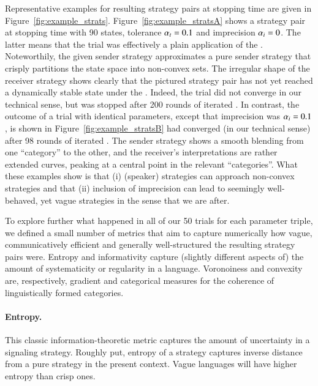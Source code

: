 Representative examples for resulting strategy pairs at stopping time
are given in
Figure~\ref{fig:example_strats}. Figure~\ref{fig:example_stratsA}
shows a strategy pair at stopping time with 90 states, tolerance
$\alpha_t = 0.1$ and imprecision $\alpha_i = 0$. The latter means
that the trial was effectively a plain application of the
\rd. Noteworthily, the given sender strategy approximates a pure
sender strategy that crisply partitions the state space into
non-convex sets. The irregular shape of the receiver strategy shows
clearly that the pictured strategy pair has not yet reached a
dynamically stable state under the \rd. Indeed, the trial did not
converge in our technical sense, but was stopped after 200 rounds of
iterated \rdd. In contrast, the outcome of a trial with identical
parameters, except that imprecision was $\alpha_i = 0.1$, is shown
in Figure~\ref{fig:example_stratsB} had converged (in our technical
sense) after 98 rounds of iterated \rdd. The sender strategy shows a
smooth blending from one ``category'' to the other, and the receiver's
interpretations are rather extended curves, peaking at a central point
in the relevant ``categories''. What these examples show is that (i)
(speaker) strategies can approach non-convex strategies and that (ii)
inclusion of imprecision can lead to seemingly well-behaved, yet vague
strategies in the sense that we are after.

To explore further what happened in all of our 50 trials for each
parameter triple, we defined a small number of metrics that aim to
capture numerically how vague, communicatively efficient and generally
well-structured the resulting strategy pairs were. Entropy and
informativity capture (slightly different aspects of) the amount of
systematicity or regularity in a language. Voronoiness and convexity
are, respectively, gradient and categorical measures for the coherence
of linguistically formed categories.

\paragraph{Entropy.} This classic information-theoretic metric
captures the amount of uncertainty in a signaling strategy. Roughly
put, entropy of a strategy captures inverse distance from a pure
strategy in the present context. Vague languages will have higher
entropy than crisp ones.

